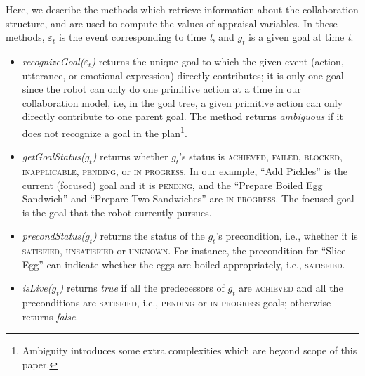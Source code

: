 \documentclass{sig-alternate-05-2015}
\begin{document}
Here, we describe the methods which retrieve information about the collaboration
structure, and are used to compute the values of appraisal variables. In these
methods, $\varepsilon_t$ is the event corresponding to time \textit{t}, and
$g_t$ is a given goal at time \textit{t}.

\begin{itemize}[leftmargin=2pt]
  \setlength\itemsep{0.02mm}
  \item \textit{recognizeGoal($\varepsilon_t$)} returns the unique goal to which
  the given event (action, utterance, or emotional expression) directly
  contributes; it is only one goal since the robot can only do one primitive
  action at a time in our collaboration model, i.e, in the goal tree, a given
  primitive action can only directly contribute to one parent goal. The method
  returns \textit{ambiguous} if it does not recognize a goal in the
  plan\footnote{Ambiguity introduces some extra complexities which are beyond
  scope of this paper.}.
   
  
  \item \textit{getGoalStatus($g_t$)} returns whether $g_t$'s status is
  \textsc{achieved, failed, blocked, inapplicable, pending,} or \textsc{in
  progress}. In our example, ``Add Pickles'' is the current (focused) goal and
  it is \textsc{pending}, and the ``Prepare Boiled Egg Sandwich'' and ``Prepare
  Two Sandwiches'' are \textsc{in progress}. The focused goal is the goal
  that the robot currently pursues.
  
  \item \textit{precondStatus($g_t$)} returns the status of the $g_t$'s
  precondition, i.e., whether it is \textsc{satisfied, unsatisfied} or
  \textsc{unknown}. For instance, the precondition for ``Slice Egg'' can
  indicate whether the eggs are boiled appropriately, i.e., \textsc{satisfied}.
  
  \item \textit{isLive($g_t$)} returns \textit{true} if all the predecessors of
  $g_t$ are \textsc{achieved} and all the preconditions are \textsc{satisfied},
  i.e., \textsc{pending} or \textsc{in progress} goals; otherwise returns \textit{false}.
  

\end{itemize}
\end{document}
